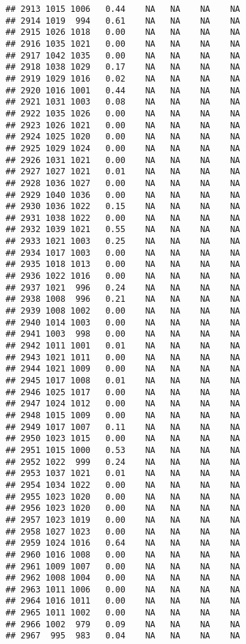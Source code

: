 \documentclass{article}\usepackage{graphicx, color}
\makeatletter
\newenvironment{kframe}{%
 \def\at@end@of@kframe{}%
 \ifinner\ifhmode%
  \def\at@end@of@kframe{\end{minipage}}%
  \begin{minipage}{\columnwidth}%
 \fi\fi%
 \def\FrameCommand##1{\hskip\@totalleftmargin \hskip-\fboxsep
 \colorbox{shadecolor}{##1}\hskip-\fboxsep
     \hskip-\linewidth \hskip-\@totalleftmargin \hskip\columnwidth}%
 \MakeFramed {\advance\hsize-\width
   \@totalleftmargin\z@ \linewidth\hsize
   \@setminipage}}%
 {\par\unskip\endMakeFramed%
 \at@end@of@kframe}
\newenvironment{knitrout}{}{} %
\makeatother
\begin{document}
\begin{knitrout}
\begin{kframe}
\begin{verbatim}
## 2913 1015 1006   0.44    NA   NA    NA    NA
## 2914 1019  994   0.61    NA   NA    NA    NA
## 2915 1026 1018   0.00    NA   NA    NA    NA
## 2916 1035 1021   0.00    NA   NA    NA    NA
## 2917 1042 1035   0.00    NA   NA    NA    NA
## 2918 1038 1029   0.17    NA   NA    NA    NA
## 2919 1029 1016   0.02    NA   NA    NA    NA
## 2920 1016 1001   0.44    NA   NA    NA    NA
## 2921 1031 1003   0.08    NA   NA    NA    NA
## 2922 1035 1026   0.00    NA   NA    NA    NA
## 2923 1026 1021   0.00    NA   NA    NA    NA
## 2924 1025 1020   0.00    NA   NA    NA    NA
## 2925 1029 1024   0.00    NA   NA    NA    NA
## 2926 1031 1021   0.00    NA   NA    NA    NA
## 2927 1027 1021   0.01    NA   NA    NA    NA
## 2928 1036 1027   0.00    NA   NA    NA    NA
## 2929 1040 1036   0.00    NA   NA    NA    NA
## 2930 1036 1022   0.15    NA   NA    NA    NA
## 2931 1038 1022   0.00    NA   NA    NA    NA
## 2932 1039 1021   0.55    NA   NA    NA    NA
## 2933 1021 1003   0.25    NA   NA    NA    NA
## 2934 1017 1003   0.00    NA   NA    NA    NA
## 2935 1018 1013   0.00    NA   NA    NA    NA
## 2936 1022 1016   0.00    NA   NA    NA    NA
## 2937 1021  996   0.24    NA   NA    NA    NA
## 2938 1008  996   0.21    NA   NA    NA    NA
## 2939 1008 1002   0.00    NA   NA    NA    NA
## 2940 1014 1003   0.00    NA   NA    NA    NA
## 2941 1003  998   0.00    NA   NA    NA    NA
## 2942 1011 1001   0.01    NA   NA    NA    NA
## 2943 1021 1011   0.00    NA   NA    NA    NA
## 2944 1021 1009   0.00    NA   NA    NA    NA
## 2945 1017 1008   0.01    NA   NA    NA    NA
## 2946 1025 1017   0.00    NA   NA    NA    NA
## 2947 1024 1012   0.00    NA   NA    NA    NA
## 2948 1015 1009   0.00    NA   NA    NA    NA
## 2949 1017 1007   0.11    NA   NA    NA    NA
## 2950 1023 1015   0.00    NA   NA    NA    NA
## 2951 1015 1000   0.53    NA   NA    NA    NA
## 2952 1022  999   0.24    NA   NA    NA    NA
## 2953 1037 1021   0.01    NA   NA    NA    NA
## 2954 1034 1022   0.00    NA   NA    NA    NA
## 2955 1023 1020   0.00    NA   NA    NA    NA
## 2956 1023 1020   0.00    NA   NA    NA    NA
## 2957 1023 1019   0.00    NA   NA    NA    NA
## 2958 1027 1023   0.00    NA   NA    NA    NA
## 2959 1024 1016   0.64    NA   NA    NA    NA
## 2960 1016 1008   0.00    NA   NA    NA    NA
## 2961 1009 1007   0.00    NA   NA    NA    NA
## 2962 1008 1004   0.00    NA   NA    NA    NA
## 2963 1011 1006   0.00    NA   NA    NA    NA
## 2964 1016 1011   0.00    NA   NA    NA    NA
## 2965 1011 1002   0.00    NA   NA    NA    NA
## 2966 1002  979   0.09    NA   NA    NA    NA
## 2967  995  983   0.04    NA   NA    NA    NA

\end{verbatim}
\end{kframe}
\end{knitrout}
\end{document}
